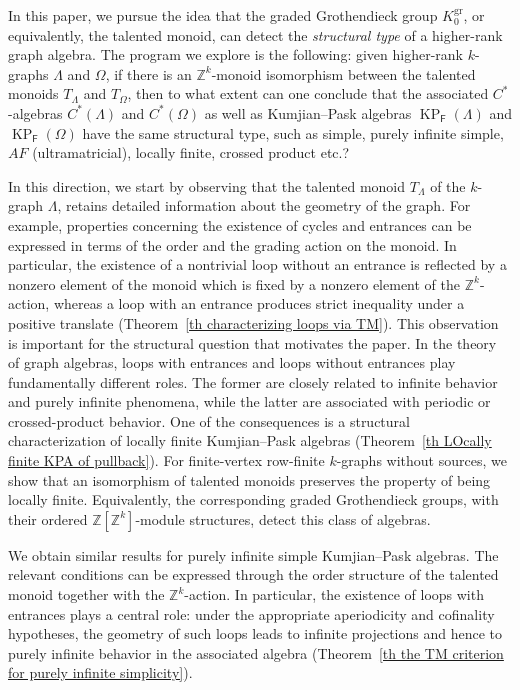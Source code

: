 \documentclass[a4paper,reqno,12pt]{amsart}
\numberwithin{equation}{section}
\theoremstyle{definition}
\theoremstyle{remark}
\def\FF{\mathsf{F}}
\newcommand{\gr}{\operatorname{gr}}
\begin{document}
In this paper, we pursue the idea that the graded Grothendieck group $K_0^{\gr}$, or equivalently, the talented monoid, can detect the \emph{structural type} of a higher-rank graph algebra. 
The program we explore is the following: given higher-rank $k$-graphs $\Lambda$ and $\Omega$, if there is an $\mathbb Z^k$-monoid isomorphism between the talented monoids $T_\Lambda$ and $T_\Omega$, then to what extent can one conclude that the associated $C^*$-algebras $C^*(\Lambda)$ and $C^*(\Omega)$ as well as Kumjian--Pask algebras $\operatorname{KP}_\FF(\Lambda)$ and $\operatorname{KP}_\FF(\Omega)$ have the same structural type, such as simple, purely infinite simple, $AF$ (ultramatricial), locally finite, crossed product etc.? 

In this direction, we start by observing that the talented monoid  $T_\Lambda$ of the $k$-graph $\Lambda$, retains detailed information about the geometry of the graph. For example, properties concerning the existence of cycles and entrances can be expressed in terms of the order and the grading action on the monoid. In particular, the existence of a nontrivial loop without an entrance is reflected by a nonzero element of the monoid which is fixed by a nonzero element of the $\mathbb Z^k$-action, whereas a loop with an entrance produces strict inequality under a positive translate (Theorem~\ref{th characterizing loops via TM}). This observation is important for the structural question that motivates the paper. In the theory of graph algebras, loops with entrances and loops without entrances play fundamentally different roles. The former are closely related to infinite behavior and purely infinite phenomena, while the latter are associated with periodic or crossed-product behavior. One of the consequences is a structural characterization of locally finite Kumjian--Pask algebras (Theorem~\ref{th LOcally finite KPA of pullback}). For finite-vertex row-finite $k$-graphs without sources, we show that an isomorphism of talented monoids preserves the property of being locally finite. Equivalently, the corresponding graded Grothendieck groups, with their ordered $\mathbb Z[\mathbb Z^k]$-module structures, detect this class of algebras.

We obtain similar results for purely infinite simple Kumjian--Pask algebras. The relevant conditions can be expressed through the order structure of the talented monoid together with the $\mathbb Z^k$-action. In particular, the existence of loops with entrances plays a central role: under the appropriate aperiodicity and cofinality hypotheses, the geometry of such loops leads to infinite projections and hence to purely infinite behavior in the associated algebra (Theorem~\ref{th the TM criterion for purely infinite simplicity}).
\end{document}
